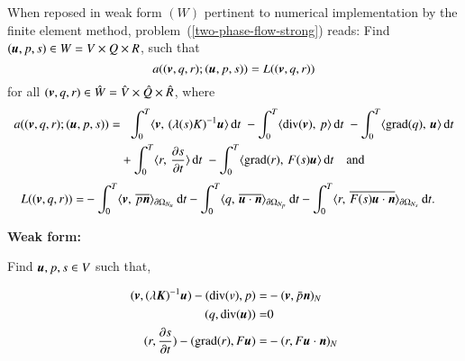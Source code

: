 When reposed in weak form $(W)$ pertinent to numerical implementation
by the finite element method, problem~(\ref{two-phase-flow-strong})
reads: Find $(\mbox{\boldmath$ u$}, p, s) \in W = V \times Q \times R$, such that
\begin{equation}
a((\mbox{\boldmath$ v$}, q, r); (\mbox{\boldmath$ u$}, p, s)) = L((\mbox{\boldmath$ v$}, q, r))
\end{equation}
for all $(\mbox{\boldmath$ v$}, q, r) \in \hat{W} =  \hat{V} \times \hat{Q} \times
\hat{R}$,
where
\begin{equation}
\begin{split}
a((\mbox{\boldmath$ v$}, q, r); (\mbox{\boldmath$ u$}, p, s)) = &\phantom{-}
    \int_{0}^{T} \langle \mbox{\boldmath$ v$},\, (\lambda(s) K)^{-1} \mbox{\boldmath$ u$} \rangle \, \mathrm{d}t\;
  - \int_{0}^{T} \langle \mathrm{div}(\mbox{\boldmath$ v$}),\, p \rangle \, \mathrm{d}t\;
- \int_{0}^{T} \langle \mathrm{grad}(q),\, \mbox{\boldmath$ u$} \rangle \, \mathrm{d}t\\
& + \int_{0}^{T} \langle r,\, \frac{\partial s}{\partial t} \rangle \, \mathrm{d}t\;
  - \int_{0}^{T} \langle \mathrm{grad}(r),\, F(s) \mbox{\boldmath$ u$} \rangle \, \mathrm{d}t
  \quad \mathrm{and}
\end{split}
\end{equation}
\begin{equation}
\begin{split}
L((\mbox{\boldmath$ v$}, q, r)) =
& - \int_{0}^{T} \langle \mbox{\boldmath$ v$},\, \overline{p \mbox{\boldmath$ n$}} \rangle_{\partial
  \Omega_{N_{u}}} \, \mathrm{d}t
 - \int_{0}^{T} \langle q,\, \overline{\mbox{\boldmath$ u$} \cdot \mbox{\boldmath$ n$}}
\rangle_{\partial \Omega_{N_{p}}} \, \mathrm{d}t
 - \int_{0}^{T} \langle r,\, \overline{F(s) \mbox{\boldmath$ u$} \cdot \mbox{\boldmath$ n$}}
\rangle_{\partial \Omega_{N_{s}}} \, \mathrm{d}t.
\end{split}
\end{equation}




{\bf Weak form:}

Find $\mbox{\boldmath$ u$}, p, s \in V$ such that,

\begin{equation}
\begin{split}
(\mbox{\boldmath$ v$}, (\lambda\mbox{\boldmath$ K$})^{-1}\mbox{\boldmath$ u$}) - (\mathrm{div}(v), p) = & - (\mbox{\boldmath$ v$}, \bar{p}\mbox{\boldmath$ n$})_N \\
                           (q, \mathrm{div}(\mbox{\boldmath$ u$})) = & 0\\
(r, \frac{\partial s}{\partial t}) - (\mathrm{grad}(r), F\mbox{\boldmath$ u$}) = & - (r,
F\mbox{\boldmath$ u$}\cdot\mbox{\boldmath$ n$})_N
\end{split}
\end{equation}

